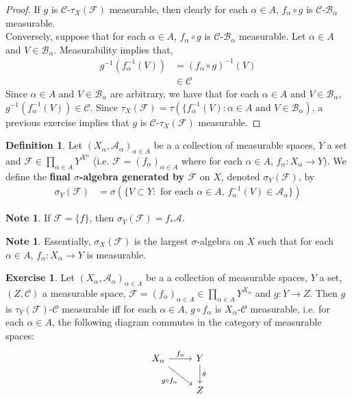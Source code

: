 \documentclass{book}
\theoremstyle{definition}
\newtheorem{defn}[definition]{Definition}
\newtheorem{note}[definition]{Note}
\newtheorem{ex}[definition]{Exercise}
\newcommand{\al}{\alpha}
\newcommand{\sig}{\sigma}
\newcommand{\MA}{\mathcal{A}}
\newcommand{\MB}{\mathcal{B}}
\newcommand{\MC}{\mathcal{C}}
\newcommand{\MF}{\mathcal{F}}
\newcommand{\ld}[1]{\label{defn:#1}}
\DeclareMathOperator*{\0}{\mbf{0}}
\DeclareMathOperator*{\1}{\mbf{1}}
\begin{document}
	\begin{proof}
		If $g$ is $\MC$-$\tau_X(\MF)$ measurable, then clearly for each $\al \in A$, $ f_{\al} \circ g$ is $\MC$-$\MB_{\al}$ measurable. \\
		Conversely, suppose that for each $\al \in A$, $f_{\al} \circ g$ is $\MC$-$\MB_{\al}$ measurable. Let $\al \in A$ and $V \in \MB_{\al}$. Measurability implies that,
		\begin{align*}
			g^{-1}(f_{\al}^{-1}(V)) 
			& = (f_{\al} \circ g)^{-1}(V) \\
			& \in \MC
		\end{align*}
		Since $\al \in A$ and $V \in \MB_{\al}$ are arbitrary, we have that for each $\al \in A$ and $V \in \MB_{\al}$, $g^{-1}(f_{\al}^{-1}(V)) \in \MC$. Since $\tau_X(\MF) = \tau(\{f_{\al}^{-1}(V): \al \in A \text{ and } V \in \MB_{\al})$, a previous exercise implies that $g$ is $\MC$-$\tau_X(\MF)$  measurable.
	\end{proof}
	
	\begin{defn} \ld{}
		Let $(X_{\al}, \MA_{\al})_{\al \in A}$ be a a collection of measurable spaces, $Y$ a set and $\MF \in \prod \limits_{\al \in A}Y^{X^{\al}}$ (i.e. $\MF = (f_{\al})_{\al \in A}$ where for each $\al \in A$, $f_{\al}:X_{\al} \rightarrow Y$). We define the \textbf{final $\sig$-algebra generated by $\MF$} on $X$, denoted $\sig_Y(\MF)$, by 
		\begin{align*}
			\sig_Y(\MF) 
			&= \sig(\{V \subset Y: \text{ for each $\al \in A$, $f_{\al}^{-1}(V) \in \MA_{\al}$}\})
		\end{align*}	 
	\end{defn}
	
	\begin{note}
		If $\MF = \{f\}$, then $\sig_Y(\MF) = f_*\MA$.
	\end{note}
	
	\begin{note}
		Essentially, $\sig_X(\MF)$ is the largest $\sig$-algebra on $X$ such that for each $\al \in A$, $f_{\al}:X_{\al} \rightarrow Y$ is measurable. 
	\end{note}
	
	\begin{ex}
		Let $(X_{\al}, \MA_{\al})_{\al \in A}$ be a a collection of measurable spaces, $Y$ a set, $(Z, \MC)$ a measurable space, $\MF = (f_{\al})_{\al \in A} \in \prod \limits_{\al \in A}Y^{X_{\al}}$ and $g: Y \rightarrow Z$. Then $g$ is $\tau_Y(\MF)$-$\MC$ measurable iff for each $\al \in A$, $g \circ f_{\al}$ is $X_{\al}$-$\MC$ measurable, i.e. for each $\al \in A$, the following diagram commutes in the category of measurable spaces: 
		\[ \begin{tikzcd}
			X_{\al} \arrow[r, "f_{\al}"] \arrow[dr, "g \circ f_{\al}"'] 	
			& Y  \arrow[d, "g"] \\
			& Z 
		\end{tikzcd}
		\]
	\end{ex}
	
\end{document}

